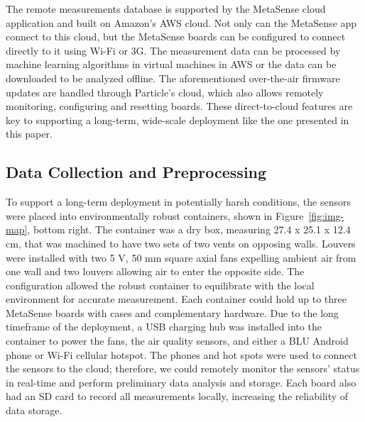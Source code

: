 \documentclass[journal abbreviation, manuscript]{copernicus}
\newcommand{\textus}[1]{$_{\text{#1}}$}
\begin{document}

The remote measurements database is supported by the MetaSense cloud application and built on Amazon's AWS cloud.  Not only can the MetaSense app connect to this cloud, but the MetaSense boards can be configured to connect directly to it using Wi-Fi or 3G.  The measurement data can be processed by machine learning algorithms in virtual machines in AWS or the data can be downloaded to be analyzed offline.  The aforementioned over-the-air firmware updates are handled through Particle's cloud, which also allows remotely monitoring, configuring and resetting boards. These direct-to-cloud features are key to supporting a long-term, wide-scale deployment like the one presented in this paper.

\subsection{Data Collection and Preprocessing}
\label{DataCollection}
To support a long-term deployment in potentially harsh conditions, the sensors were placed into environmentally robust containers, shown in Figure~\ref{fig:img-map}, bottom right. The container was a dry box, measuring 27.4 x 25.1 x 12.4 cm, that was machined to have two sets of two vents on opposing walls. Louvers were installed with two 5 V, 50 mm square axial fans expelling ambient air from one wall and two louvers allowing air to enter the opposite side. The configuration allowed the robust container to equilibrate with the local environment for accurate measurement.  Each container could hold up to three MetaSense boards with cases and complementary hardware.  Due to the long timeframe of the deployment, a USB charging hub was installed into the container to power the fans, the air quality sensors, and either a BLU Android phone or Wi-Fi cellular hotspot. The phones and hot spots were used to connect the sensors to the cloud; therefore, we could remotely monitor the sensors’ status in real-time and perform preliminary data analysis and storage. Each board also had an SD card to record all measurements locally, increasing the reliability of data storage. 
\end{document}

